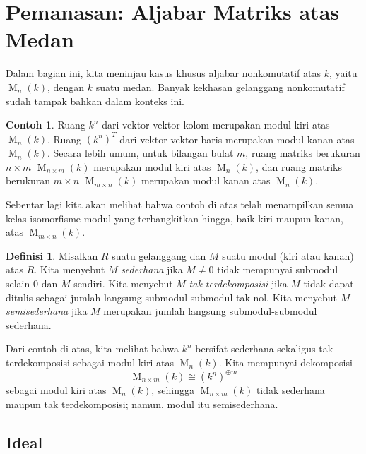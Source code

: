 \documentclass[12pt]{article}
\theoremstyle{plain}
\theoremstyle{definition}
\newtheorem{definition}[theorem]{Definisi}
\newtheorem{example}[theorem]{Contoh}
\theoremstyle{remark}
\numberwithin{equation}{section}
\begin{document}

\section{Pemanasan: Aljabar Matriks atas Medan}

Dalam bagian ini, kita meninjau kasus khusus aljabar nonkomutatif
atas $k$, yaitu $\operatorname{M}_n(k)$, dengan $k$ suatu medan.
Banyak kekhasan gelanggang nonkomutatif sudah tampak bahkan dalam
konteks ini.

\begin{example}
Ruang $k^n$ dari vektor-vektor kolom merupakan modul kiri atas $\operatorname{M}_n(k)$.
Ruang $(k^n)^T$ dari vektor-vektor baris merupakan modul kanan atas $\operatorname{M}_n(k)$.
Secara lebih umum, untuk bilangan bulat $m$, ruang matriks berukuran $n \times m$
$\operatorname{M}_{n \times m}(k)$ merupakan modul kiri atas $\operatorname{M}_n(k)$,
dan ruang matriks berukuran $m \times n$
$\operatorname{M}_{m \times n}(k)$ merupakan modul kanan atas $\operatorname{M}_n(k)$.
\end{example}

Sebentar lagi kita akan melihat bahwa contoh di atas telah
menampilkan semua kelas isomorfisme modul yang terbangkitkan hingga,
baik kiri maupun kanan, atas $\operatorname{M}_{m \times n}(k)$.

\begin{definition}
Misalkan $R$ suatu gelanggang dan $M$ suatu modul (kiri atau kanan) atas $R$.
Kita menyebut $M$ \emph{sederhana} jika $M\ne 0$ tidak mempunyai submodul selain
$0$ dan $M$ sendiri.
Kita menyebut $M$ \emph{tak terdekomposisi} jika $M$ tidak dapat ditulis sebagai jumlah langsung
submodul-submodul tak nol.
Kita menyebut $M$ \emph{semisederhana} jika $M$ merupakan jumlah langsung
submodul-submodul sederhana.
\end{definition}

Dari contoh di atas, kita melihat bahwa $k^n$ bersifat sederhana sekaligus
tak terdekomposisi sebagai modul kiri atas $\operatorname{M}_n(k)$.
Kita mempunyai dekomposisi
\[
\operatorname{M}_{n \times m}(k) \cong (k^n)^{\oplus m}
\]
sebagai modul kiri atas $\operatorname{M}_n(k)$,
sehingga $\operatorname{M}_{n \times m}(k)$ tidak sederhana maupun
tak terdekomposisi; namun, modul itu semisederhana.

\subsection{Ideal}
\end{document}
